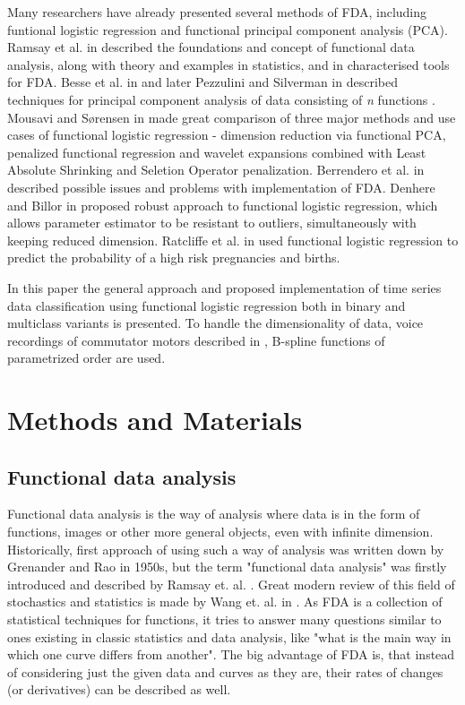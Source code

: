 \documentclass[energies,article,submit,pdftex,moreauthors]{Definitions/mdpi}
\begin{document}
Many researchers have already presented several methods of FDA, including funtional logistic regression  and functional principal component analysis (PCA). Ramsay et al. in \cite{ramsay-logreg2, ramsay1982data} described the foundations and concept of functional data analysis, along with theory and examples in statistics, and in \cite{ramsay-logreg} characterised tools for FDA. Besse et al. in  \cite{besse-pca} and later Pezzulini and Silverman in \cite{pezzulini-pca} described techniques for principal component analysis of data consisting of \textit{n} functions . Mousavi and Sørensen in  \cite{logreg-comparison} made great comparison of three major methods and use cases of functional logistic regression - dimension reduction via functional PCA, penalized functional regression and wavelet expansions combined with Least Absolute Shrinking and Seletion Operator penalization. Berrendero et al. in \cite{logreg-issues} described possible issues and problems with implementation of FDA. Denhere and Billor in \cite{denhere-robust-logreg} proposed robust approach to functional logistic regression, which allows parameter estimator to be resistant to outliers, simultaneously with keeping reduced dimension. Ratcliffe et al. in \cite{ratcliffe-pregnancies} used functional logistic regression to predict the probability of a high risk pregnancies and births. 

In this paper the general approach and proposed implementation of time series data classification using functional logistic regression both in binary and multiclass variants is presented. To handle the dimensionality of data, voice recordings of commutator motors described in \cite{ref-motors}, B-spline functions of parametrized order are used.


\section{Methods and Materials}
\subsection{Functional data analysis}
Functional data analysis is the way of analysis where data is in the form of functions, images or other more general objects, even with infinite dimension. Historically, first approach of using such a way of analysis was written down by Grenander \cite{grenander1950stochastic} and Rao \cite{rao1958some} in 1950s, but the term "functional data analysis" was firstly introduced and described by Ramsay et. al. \cite{ramsay-logreg, ramsay-logreg2, ramsay1982data}. Great modern review of this field of stochastics and statistics is made by Wang et. al. in \cite{wang2016functional}. As FDA is a collection of statistical techniques for functions, it tries to answer many questions similar to ones existing in classic statistics and data analysis, like "what is the main way in which one curve differs from another". The big advantage of FDA is, that instead of considering just the given data and curves as they are, their rates of changes (or derivatives) can be described as well.
\end{document}
